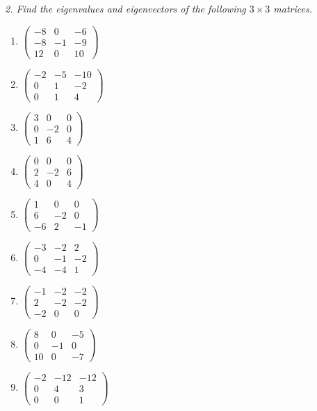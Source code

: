 \emph{2. Find the eigenvalues and eigenvectors of the following
$3\times3$ matrices.}
\bigskip
\begin{enumerate}[label=\arabic*., leftmargin=*]
\item $\begin{pmatrix}-8 & 0 & -6\\ -8 & -1 & -9\\ 12 & 0 & 10\end{pmatrix}$
\item $\begin{pmatrix}-2 & -5 & -10\\ 0 & 1 & -2\\ 0 & 1 & 4\end{pmatrix}$
\item $\begin{pmatrix}3 & 0 & 0\\ 0 & -2 & 0\\ 1 & 6 & 4\end{pmatrix}$
\item $\begin{pmatrix}0 & 0 & 0\\ 2 & -2 & 6\\ 4 & 0 & 4\end{pmatrix}$
\item $\begin{pmatrix}1 & 0 & 0\\ 6 & -2 & 0\\ -6 & 2 & -1\end{pmatrix}$
\item $\begin{pmatrix}-3 & -2 & 2\\ 0 & -1 & -2\\ -4 & -4 & 1\end{pmatrix}$
\item $\begin{pmatrix}-1 & -2 & -2\\ 2 & -2 & -2\\ -2 & 0 & 0\end{pmatrix}$
\item $\begin{pmatrix}8 & 0 & -5\\ 0 & -1 & 0\\ 10 & 0 & -7\end{pmatrix}$
\item $\begin{pmatrix}-2 & -12 & -12\\ 0 & 4 & 3\\ 0 & 0 & 1\end{pmatrix}$

\end{enumerate}
